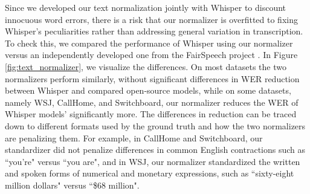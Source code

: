 \documentclass[nohyperref]{article}
\theoremstyle{plain}
\theoremstyle{definition}
\theoremstyle{remark}
\begin{document}
Since we developed our text normalization jointly with Whisper to discount innocuous word errors, there is a risk that our normalizer is overfitted to fixing Whisper's peculiarities rather than addressing general variation in transcription. To check this, we compared the performance of Whisper using our normalizer versus an independently developed one from the FairSpeech project \cite{koenecke2020racial}. In Figure \ref{fig:text_normalizer}, we visualize the differences. On most datasets the two normalizers perform similarly, without significant differences in WER reduction between Whisper and compared open-source models, while on some datasets, namely WSJ, CallHome, and Switchboard, our normalizer reduces the WER of Whisper models' significantly more. The differences in reduction can be traced down to different formats used by the ground truth and how the two normalizers are penalizing them. For example, in CallHome and Switchboard, our standardizer did not penalize differences in common English contractions such as ``you're" versus ``you are", and in WSJ, our normalizer standardized the written and spoken forms of numerical and monetary expressions, such as ``sixty-eight million dollars" versus ``\$68 million".
\end{document}
